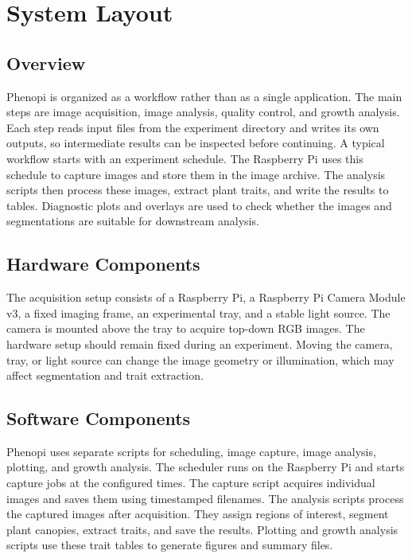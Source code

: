 \section{System Layout}

\subsection{Overview}

Phenopi is organized as a workflow rather than as a single application. The
main steps are image acquisition, image analysis, quality control, and growth
analysis. Each step reads input files from the experiment directory and writes
its own outputs, so intermediate results can be inspected before continuing. A
typical workflow starts with an experiment schedule. The Raspberry Pi uses this
schedule to capture images and store them in the image archive. The analysis
scripts then process these images, extract plant traits, and write the results
to tables. Diagnostic plots and overlays are used to check whether the images
and segmentations are suitable for downstream analysis.

\subsection{Hardware Components}

The acquisition setup consists of a Raspberry Pi, a Raspberry Pi Camera Module
v3, a fixed imaging frame, an experimental tray, and a stable light source. The
camera is mounted above the tray to acquire top-down RGB images. The hardware
setup should remain fixed during an experiment. Moving the camera, tray, or
light source can change the image geometry or illumination, which may affect
segmentation and trait extraction.

\subsection{Software Components}

Phenopi uses separate scripts for scheduling, image capture, image analysis,
plotting, and growth analysis. The scheduler runs on the Raspberry Pi and
starts capture jobs at the configured times. The capture script acquires
individual images and saves them using timestamped filenames. The analysis
scripts process the captured images after acquisition. They assign regions of
interest, segment plant canopies, extract traits, and save the results.
Plotting and growth analysis scripts use these trait tables to generate figures
and summary files.

